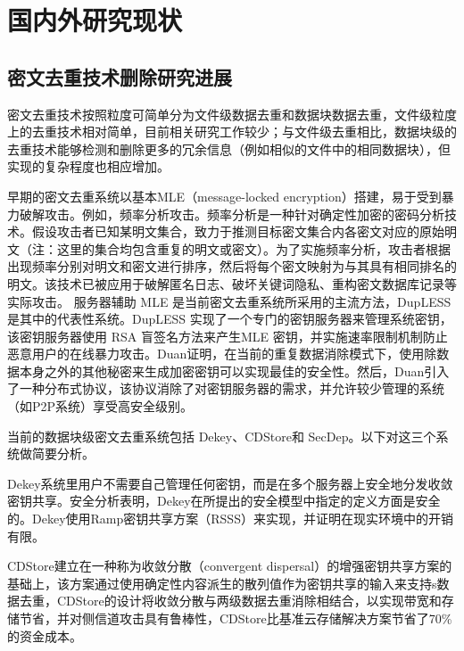 \documentclass[promaster]{thesis-uestc}
\begin{document}
\section{国内外研究现状}
\subsection{密文去重技术删除研究进展}\label{ciphertext_dedup}
密文去重技术按照粒度可简单分为文件级数据去重和数据块数据去重，文件级粒度上的去重技术相对简单，目前相关研究工作较少；与文件级去重相比，数据块级的去重技术能够检测和删除更多的冗余信息（例如相似的文件中的相同数据块），但实现的复杂程度也相应增加。

早期的密文去重系统以基本\acrshort{MLE}（message-locked encryption）搭建，易于受到暴力破解攻击。例如，频率分析攻击。频率分析是一种针对确定性加密的密码分析技术。假设攻击者已知某明文集合，致力于推测目标密文集合内各密文对应的原始明文（注：这里的集合均包含重复的明文或密文）。为了实施频率分析，攻击者根据出现频率分别对明文和密文进行排序，然后将每个密文映射为与其具有相同排名的明文。该技术已被应用于破解匿名日志、破坏关键词隐私、重构密文数据库记录等实际攻击。
服务器辅助 \acrshort{MLE} 是当前密文去重系统所采用的主流方法，DupLESS是其中的代表性系统。DupLESS 实现了一个专门的密钥服务器来管理系统密钥，该密钥服务器使用 RSA 盲签名方法来产生\acrshort{MLE}
密钥，并实施速率限制机制防止恶意用户的在线暴力攻击。Duan证明，在当前的重复数据消除模式下，使用除数据本身之外的其他秘密来生成加密密钥可以实现最佳的安全性。然后，Duan引入了一种分布式协议，该协议消除了对密钥服务器的需求，并允许较少管理的系统（如P2P系统）享受高安全级别。

当前的数据块级密文去重系统包括 Dekey、CDStore和 SecDep。以下对这三个系统做简要分析。

Dekey系统里用户不需要自己管理任何密钥，而是在多个服务器上安全地分发收敛密钥共享。安全分析表明，Dekey在所提出的安全模型中指定的定义方面是安全的。Dekey使用Ramp密钥共享方案（RSSS）来实现，并证明在现实环境中的开销有限。

CDStore建立在一种称为收敛分散（convergent dispersal）的增强密钥共享方案的基础上，该方案通过使用确定性内容派生的散列值作为密钥共享的输入来支持s数据去重，CDStore的设计将收敛分散与两级数据去重消除相结合，以实现带宽和存储节省，并对侧信道攻击具有鲁棒性，CDStore比基准云存储解决方案节省了70\%的资金成本。
\end{document}

